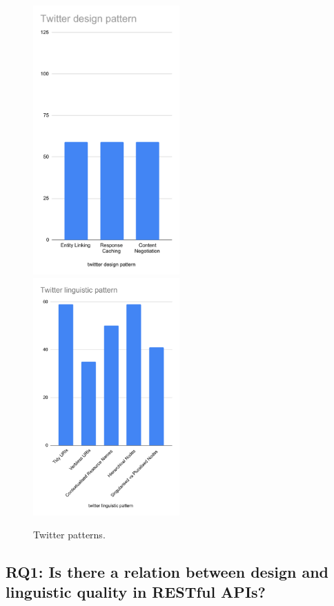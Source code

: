 \begin{figure}[htb!]
\includegraphics[width=0.5\textwidth]{img/exampleBars/twitterDesAnti.pdf}
\includegraphics[width=0.5\textwidth]{img/exampleBars/twitterLingPatt.pdf}
\caption{Twitter patterns.}
\label{fig:twitterBarPattEx}
\end{figure}

\clearpage

\subsection{RQ1: Is there a relation between design and linguistic quality in RESTful APIs?}

